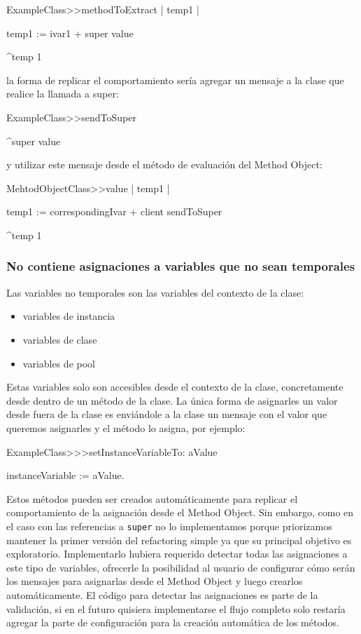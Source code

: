 \begin{code}
ExampleClass>>methodToExtract | temp1 |

    temp1 := ivar1 + super value

    ^temp 1
\end{code}

la forma de replicar el comportamiento sería agregar un mensaje a la clase que
realice la llamada a super:

\begin{code}
ExampleClass>>sendToSuper

    ^super value
\end{code}

y utilizar este mensaje desde el método de evaluación del Method Object:

\begin{code}
MehtodObjectClass>>value | temp1 |

    temp1 := correspondingIvar + client sendToSuper

    ^temp 1
\end{code}


\subsubsection*{No contiene asignaciones a variables que no sean temporales}

Las variables no temporales son las variables del contexto de la clase:

\begin{itemize}
    \item variables de instancia
    \item variables de clase
    \item variables de pool
\end{itemize}

Estas variables solo son accesibles desde el contexto de la clase, concretamente
desde dentro de un método de la clase. La única forma de asignarles un valor
desde fuera de la clase es enviándole a la clase un mensaje con el valor que
queremos asignarles y el método lo asigna, por ejemplo:

\begin{code}
ExampleClass>>>setInstanceVariableTo: aValue

    instanceVariable := aValue.
\end{code}

Estos métodos pueden ser creados automáticamente para replicar el comportamiento
de la asignación desde el Method Object. Sin embargo, como en el caso con las
referencias a \lstinline{super} no lo implementamos porque priorizamos mantener
la primer versión del refactoring simple ya que su principal objetivo es
exploratorio. Implementarlo hubiera requerido detectar todas las asignaciones a
este tipo de variables, ofrecerle la posibilidad al usuario de configurar cómo
serán los mensajes para asignarlas desde el Method Object y luego crearlos
automáticamente. El código para detectar las asignaciones es parte de la
validación, si en el futuro quisiera implementarse el flujo completo solo
restaría agregar la parte de configuración para la creación automática de los
métodos.



